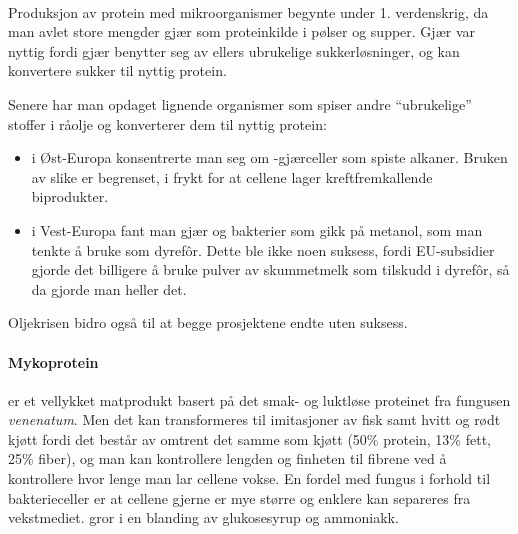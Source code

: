 \paragraph{} Produksjon av protein med mikroorganismer begynte under 1. verdenskrig, da man avlet store mengder gjær som proteinkilde i pølser og supper. Gjær var nyttig fordi gjær benytter seg av ellers ubrukelige sukkerløsninger, og kan konvertere sukker til nyttig protein. 

Senere har man opdaget lignende organismer som spiser andre ``ubrukelige'' stoffer i råolje og konverterer dem til nyttig protein:
\begin{itemize}[nolistsep,noitemsep]
	\item i Øst-Europa konsentrerte man seg om -gjærceller som spiste alkaner. Bruken av slike er begrenset, i frykt for at cellene lager kreftfremkallende biprodukter.
	\item i Vest-Europa fant man gjær og bakterier som gikk på metanol, som man tenkte å bruke som dyrefôr. Dette ble ikke noen suksess, fordi EU-subsidier gjorde det billigere å bruke pulver av skummetmelk som tilskudd i dyrefôr, så da gjorde man heller det.
\end{itemize}
Oljekrisen bidro også til at begge prosjektene endte uten suksess.

\paragraph{Mykoprotein}  er et vellykket matprodukt basert på det smak- og luktløse proteinet fra fungusen  \emph{venenatum}. Men det kan transformeres til imitasjoner av fisk samt hvitt og rødt kjøtt fordi det består av omtrent det samme som kjøtt (50\% protein, 13\% fett, 25\% fiber), og man kan kontrollere lengden og finheten til fibrene ved å kontrollere hvor lenge man lar cellene vokse. En fordel med fungus i forhold til bakterieceller er at cellene gjerne er mye større og enklere kan separeres fra vekstmediet.  gror i en blanding av glukosesyrup og ammoniakk.



